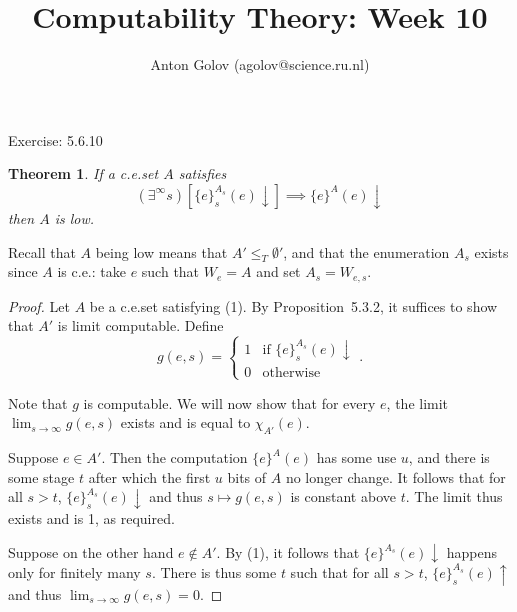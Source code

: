 \documentclass{article}
\title{Computability Theory: Week 10}
\author{Anton Golov (agolov@science.ru.nl)}
\newtheorem{theorem}{Theorem}
\newcommand{\set}[1]{\{ #1 \}}
\newcommand{\terminates}{\!\!\downarrow}
\newcommand{\diverges}{\!\!\uparrow}
\begin{document}
  \maketitle

  Exercise: 5.6.10

  \begin{theorem}
    If a c.e.\@ set $A$ satisfies
    \begin{equation}
      (\exists^\infty s)[\set{e}^{A_s}_s(e)\terminates] \implies \set{e}^A(e)\terminates
    \end{equation}
    then $A$ is low.
  \end{theorem}

  Recall that $A$ being low means that $A' \le_T \emptyset'$, and that the enumeration $A_s$ exists since $A$ is c.e.:
  take $e$ such that $W_e = A$ and set $A_s = W_{e, s}$.

  \begin{proof}
    Let $A$ be a c.e.\@ set satisfying (1).  By Proposition~5.3.2, it suffices to show that $A'$ is limit computable.
    Define
    \[
      g(e, s) =
      \begin{cases}
        1 & \text{if $\set{e}^{A_s}_s(e)\terminates$}\\
        0 & \text{otherwise}
      \end{cases}.
    \]

    Note that $g$ is computable.  We will now show that for every $e$, the limit $\lim_{s \to \infty} g(e, s)$ exists
    and is equal to $\chi_{A'}(e)$.

    Suppose $e \in A'$.  Then the computation $\set{e}^A(e)$ has some use $u$, and there is some stage $t$ after which
    the first $u$ bits of $A$ no longer change.  It follows that for all $s > t$, $\set{e}^{A_s}_s(e)\terminates$ and
    thus $s \mapsto g(e, s)$ is constant above $t$.  The limit thus exists and is 1, as required.

    Suppose on the other hand $e \not \in A'$.  By (1), it follows that $\set{e}^{A_s}(e)\terminates$ happens only for
    finitely many $s$.  There is thus some $t$ such that for all $s > t$, $\set{e}^{A_s}_s(e)\diverges$ and thus
    $\lim_{s \to \infty} g(e, s) = 0$.
  \end{proof}
\end{document}

